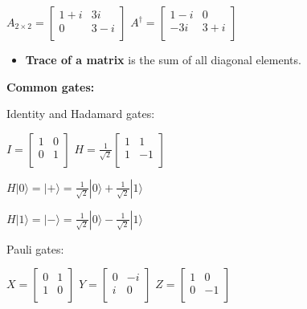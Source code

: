 \documentclass{article}
\begin{document}
\begin{center}
$
  A_{2\times2} =
  \left[ {\begin{array}{cc}
    1 + i & 3i \\
    0 & 3 - i \\
  \end{array} } \right]
$
\qquad
$
  A^\dagger =
  \left[ {\begin{array}{cc}
    1 -i & 0 \\
    -3i & 3 + i \\
  \end{array} } \right]
$
\end{center}

\begin{itemize}
	\item \textbf{Trace of a matrix} is the sum of all diagonal elements.
\end{itemize}

\newpage

\textbf{Common gates:}

Identity and Hadamard gates:
\begin{center}
$
  I =
  \left[ {\begin{array}{cc}
    1 & 0 \\
    0 & 1 \\
  \end{array} } \right]
$
\quad
$
  H = \frac{1}{\sqrt{2}} \left[ {\begin{array}{cc}
    1 & 1 \\
    1 & -1 \\
  \end{array} } \right]
$
\end{center}

\begin{center}

$H|0\rangle = |+ \rangle =  \frac{1}{\sqrt{2}} |0\rangle + \frac{1}{\sqrt{2}}|1\rangle$

$H|1\rangle = |- \rangle = \frac{1}{\sqrt{2}} |0\rangle - \frac{1}{\sqrt{2}}|1\rangle$
\end{center}



Pauli gates:
\begin{center}
$
  X = \left[ {\begin{array}{cc}
    0 & 1 \\
    1 & 0 \\
  \end{array} } \right]
$
\quad
$
 Y = \left[ {\begin{array}{cc}
    0 & -i \\
    i & 0 \\
  \end{array} } \right]
$
\quad
$
  Z = \left[ {\begin{array}{cc}
    1 & 0 \\
    0 & -1 \\
  \end{array} } \right]
$

\end{center}
\end{document}
